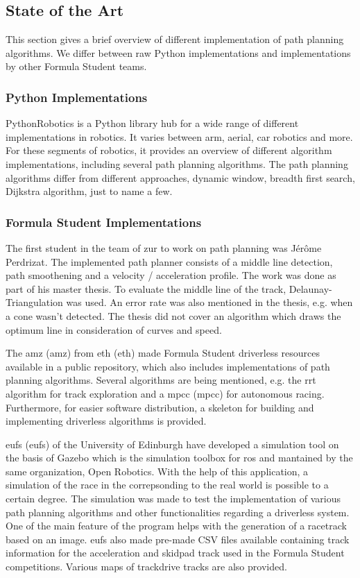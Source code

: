 \subsection{State of the Art}
This section gives a brief overview of different implementation of path planning algorithms. We differ between raw Python implementations and implementations by other Formula Student teams.

\subsubsection{Python Implementations}
PythonRobotics is a Python library hub for a wide range of different implementations in robotics. It varies between arm, aerial, car robotics and more.
For these segments of robotics, it provides an overview of different algorithm implementations, including several path planning algorithms.
The path planning algorithms differ from different approaches, dynamic window, breadth first search, Dijkstra algorithm, just to name a few. 
\cite{python_robotics}

\subsubsection{Formula Student Implementations}
The first student in the team of \acrlong{zur} to work on path planning was Jérôme Perdrizat. The implemented path planner consists of a middle line detection, path smoothening and a velocity / acceleration profile. The work was done as part of his master thesis. To evaluate the middle line of the track, Delaunay-Triangulation was used. An error rate was also mentioned in the thesis, e.g. when a cone wasn't detected. The thesis did not cover an algorithm which draws the optimum line in consideration of curves and speed.
\cite{autopilot_for_formula_student_jerome}

The \acrshort{amz} (\acrlong{amz}) from \acrshort{eth} (\acrlong{eth}) made Formula Student driverless resources available in a public repository, which also includes implementations of path planning algorithms. Several algorithms are being mentioned, e.g. the \acrshort{rrt} algorithm for track exploration and a \acrlong{mpcc} (\acrshort{mpcc}) for autonomous racing. Furthermore, for easier software distribution, a skeleton for building and implementing driverless algorithms is provided.
\cite{amz_racing_github}

\acrshort{eufs} (\acrlong{eufs}) of the University of Edinburgh have developed a simulation tool on the basis of Gazebo which is the simulation toolbox for \acrshort{ros} and mantained by the same organization, Open Robotics. With the help of this application, a simulation of the race in the correpsonding to the real world is possible to a certain degree. The simulation was made to test the implementation of various path planning algorithms and other functionalities regarding a driverless system. One of the main feature of the program helps with the generation of a racetrack based on an image. \acrshort{eufs} also made pre-made CSV files available containing track information for the acceleration and skidpad track used in the Formula Student competitions. Various maps of trackdrive tracks are also provided.
\cite{eufs_sim_gitlab}


